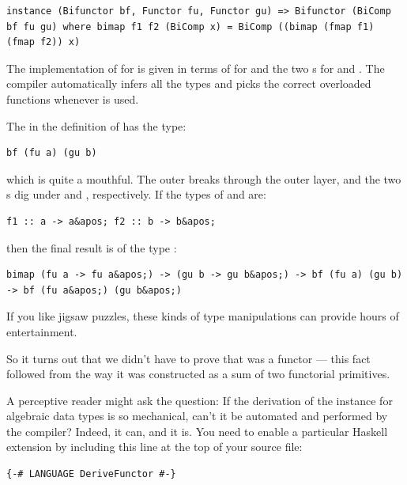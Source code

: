 \begin{verbatim}
instance (Bifunctor bf, Functor fu, Functor gu) => Bifunctor (BiComp bf fu gu) where bimap f1 f2 (BiComp x) = BiComp ((bimap (fmap f1) (fmap f2)) x) 
\end{verbatim}

The implementation of  for  is given in
terms of  for  and the two s for
 and . The compiler automatically infers all the
types and picks the correct overloaded functions whenever
 is used.

The  in the definition of  has the type:

\begin{verbatim}
bf (fu a) (gu b)
\end{verbatim}

which is quite a mouthful. The outer  breaks through the
outer  layer, and the two s dig under
 and , respectively. If the types of 
and  are:

\begin{verbatim}
f1 :: a -> a&apos; f2 :: b -> b&apos;
\end{verbatim}

then the final result is of the type
:

\begin{verbatim}
bimap (fu a -> fu a&apos;) -> (gu b -> gu b&apos;) -> bf (fu a) (gu b) -> bf (fu a&apos;) (gu b&apos;)
\end{verbatim}

If you like jigsaw puzzles, these kinds of type manipulations can
provide hours of entertainment.

So it turns out that we didn't have to prove that  was a
functor --- this fact followed from the way it was constructed as a sum
of two functorial primitives.

A perceptive reader might ask the question: If the derivation of the
 instance for algebraic data types is so mechanical,
can't it be automated and performed by the compiler? Indeed, it can, and
it is. You need to enable a particular Haskell extension by including
this line at the top of your source file:

\begin{verbatim}
{-# LANGUAGE DeriveFunctor #-}
\end{verbatim}

